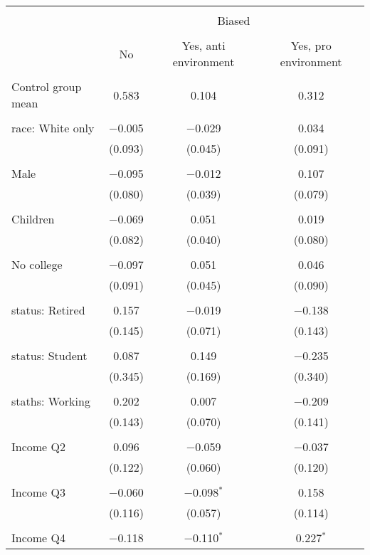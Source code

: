 
\begin{tabular}{@{\extracolsep{5pt}}lccc} 
\\[-1.8ex]\hline 
\hline \\[-1.8ex] 
 & \multicolumn{3}{c}{Biased} \\ 
\cline{2-4} 
\\[-1.8ex] & No & Yes, anti environment & Yes, pro environment \\ 
\hline \\[-1.8ex] 
 Control group mean & 0.583 & 0.104 & 0.312  \\ \hline \\[-1.8ex] race: White only & $-$0.005 & $-$0.029 & 0.034 \\ 
  & (0.093) & (0.045) & (0.091) \\ 
  & & & \\ 
 Male & $-$0.095 & $-$0.012 & 0.107 \\ 
  & (0.080) & (0.039) & (0.079) \\ 
  & & & \\ 
 Children & $-$0.069 & 0.051 & 0.019 \\ 
  & (0.082) & (0.040) & (0.080) \\ 
  & & & \\ 
 No college & $-$0.097 & 0.051 & 0.046 \\ 
  & (0.091) & (0.045) & (0.090) \\ 
  & & & \\ 
 status: Retired & 0.157 & $-$0.019 & $-$0.138 \\ 
  & (0.145) & (0.071) & (0.143) \\ 
  & & & \\ 
 status: Student & 0.087 & 0.149 & $-$0.235 \\ 
  & (0.345) & (0.169) & (0.340) \\ 
  & & & \\ 
 staths: Working & 0.202 & 0.007 & $-$0.209 \\ 
  & (0.143) & (0.070) & (0.141) \\ 
  & & & \\ 
 Income Q2 & 0.096 & $-$0.059 & $-$0.037 \\ 
  & (0.122) & (0.060) & (0.120) \\ 
  & & & \\ 
 Income Q3 & $-$0.060 & $-$0.098$^{*}$ & 0.158 \\ 
  & (0.116) & (0.057) & (0.114) \\ 
  & & & \\ 
 Income Q4 & $-$0.118 & $-$0.110$^{*}$ & 0.227$^{*}$ \\ 

\end{tabular}
